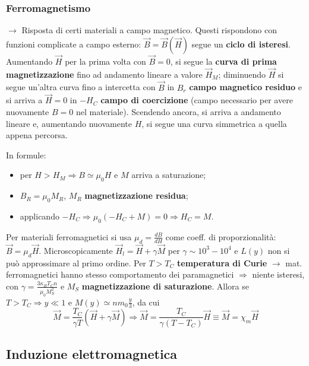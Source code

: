 \documentclass[10pt, a4paper]{scrartcl}
\numberwithin{equation}{subsection}
\theoremstyle{style1}
\begin{document}
\subsubsection{Ferromagnetismo}
$\to$ Risposta di certi materiali a campo magnetico. Questi rispondono con funzioni complicate a campo esterno: $\vec{B}=\vec{B}(\vec{H})$ segue un \textbf{ciclo di isteresi}. Aumentando $\vec{H}$ per la prima volta con $\vec{B} =0 $, si segue la \textbf{curva di prima magnetizzazione} fino ad andamento lineare a valore $\vec{H}_M$; diminuendo $\vec{H}$ si segue un'altra curva fino a intercetta con $\vec{B}$ in $B_r$ \textbf{campo magnetico residuo} e si arriva a $\vec{H}=0$ in $-H_C$ \textbf{campo di coercizione} (campo necessario per avere nuovamente $B=0$ nel materiale). Scendendo ancora, si arriva a andamento lineare e, aumentando nuovamente $H$, si segue una curva simmetrica a quella appena percorsa. 

In formule:
\begin{itemize}
	\item per $H>H_M\Rightarrow B\simeq \mu_0 H$ e $M$ arriva a saturazione;
	\item $B_R = \mu_0 M_R$, $M_R$ \textbf{magnetizzazione residua};
	\item applicando $-H_C\Rightarrow \mu_0 (-H_C + M) = 0\Rightarrow H_C = M$.
\end{itemize}
Per materiali ferromagnetici si usa $\mu _d = \frac{d B}{d H} $ come coeff. di proporzionalit\`a: $\vec{B} = \mu _d\vec{H}$. Microscopicamente $\vec{H}_l = \vec{H} + \gamma\vec{M}$ per $\gamma\sim 10^3 - 10^4$ e $L(y)$ non si pu\`o approssimare al primo ordine. Per $T>T_C$ \textbf{temperatura di Curie} $\to$ mat. ferromagnetici hanno stesso comportamento dei paramagnetici $\Rightarrow $ niente isteresi, con $\gamma = \frac{3\kappa _B T_C n}{\mu_0 M_S^2}$ e $M_S$ \textbf{magnetizzazione di saturazione}. Allora se $T>T_C\Rightarrow y\ll 1$ e $M(y) \simeq nm_0 \frac{y}{3}$, da cui
\begin{equation}
	\vec{M} = \frac{T_C}{\gamma T} (\vec{H}+ \gamma \vec{M}) \Rightarrow  \vec{M} = \frac{T_C}{\gamma(T-T_C)}\vec{H}\equiv \vec{M}=\chi _m \vec{H}
\end{equation}
\subsection{Induzione elettromagnetica}
\end{document}
